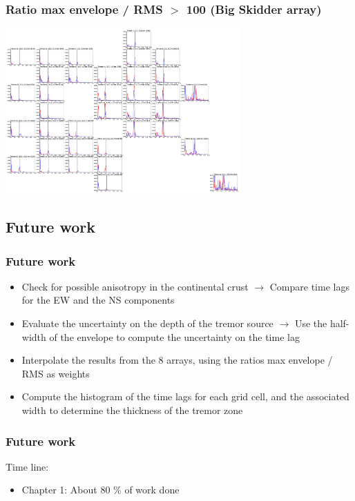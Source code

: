 \documentclass{beamer}
\begin{document}
	\begin{frame}
		\frametitle{Ratio max envelope / RMS $>$ 100 (Big Skidder array)}
		\begin{center}
			\includegraphics[width=9cm, trim={26cm 14cm 69cm 35cm}, clip]{BS/BS_PWS_PWS.eps}
		\end{center}
	\end{frame}


	\subsection{Future work}

	\begin{frame}
		\frametitle{Future work}
		\begin{itemize}
			\item Check for possible anisotropy in the continental crust $\rightarrow$ Compare time lags for the EW and the NS components
			\item Evaluate the uncertainty on the depth of the tremor source $\rightarrow$ Use the half-width of the envelope to compute the uncertainty on the time lag
			\item Interpolate the results from the 8 arrays, using the ratios max envelope / RMS as weights
			\item Compute the histogram of the time lags for each grid cell, and the associated width to determine the thickness of the tremor zone
		\end{itemize}
	\end{frame}

	\begin{frame}
		\frametitle{Future work}
		Time line:

		\vspace{2em}

		\begin{itemize}
			\item Chapter 1: About 80 \% of work done
		\end{itemize}
	\end{frame}
\end{document}
